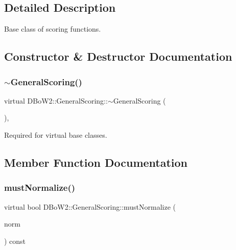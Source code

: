 \subsection{Detailed Description}
Base class of scoring functions. 

\subsection{Constructor \& Destructor Documentation}
\mbox{\label{class_d_bo_w2_1_1_general_scoring_a1796812280a5188e06d8137baa977776}} 
\subsubsection{\texorpdfstring{$\sim$\+General\+Scoring()}{~GeneralScoring()}}
{\footnotesize\ttfamily virtual D\+Bo\+W2\+::\+General\+Scoring\+::$\sim$\+General\+Scoring (\begin{DoxyParamCaption}{ }\end{DoxyParamCaption})\hspace{0.3cm}{\ttfamily [inline]}, {\ttfamily [virtual]}}



Required for virtual base classes. 



\subsection{Member Function Documentation}
\mbox{\label{class_d_bo_w2_1_1_general_scoring_ab0cadafd50b0f2f559f6325a6944f72f}} 
\subsubsection{\texorpdfstring{must\+Normalize()}{mustNormalize()}}
{\footnotesize\ttfamily virtual bool D\+Bo\+W2\+::\+General\+Scoring\+::must\+Normalize (\begin{DoxyParamCaption}\item[{\mbox{\hyperlink{namespace_d_bo_w2_a53e9e0bcfc25c861815e413a7cf3fa51}{L\+Norm}} \&}]{norm }\end{DoxyParamCaption}) const\hspace{0.3cm}{\ttfamily [pure virtual]}}

